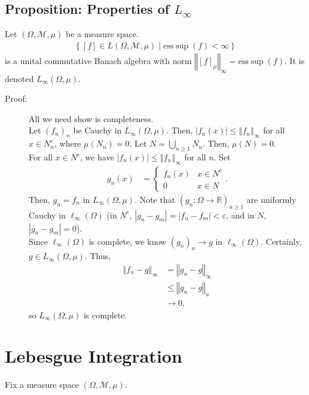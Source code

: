\documentclass[9pt]{extarticle}
\newcommand{\R}{\mathbb{R}}
\newcommand{\norm}[1]{\left\Vert #1 \right\Vert}
\newcommand{\esssup}{\text{ess}\sup}
\begin{document}
  \subsection{Proposition: Properties of $L_{\infty}$}%
  Let $(\Omega,\mathcal{M},\mu)$ be a measure space.
  \begin{align*}
    \left\{[f]\in L(\Omega,\mathcal{M},\mu)\mid \esssup(f) < \infty\right\}
  \end{align*}
  is a unital commutative Banach algebra with norm $\norm{[f]_{\mu}}_{\infty} = \esssup(f)$. It is denoted $L_{\infty}(\Omega,\mu)$.
  \begin{description}
    \item[Proof:] All we need show is completeness.\\

      Let $(f_n)_n$ be Cauchy in $L_{\infty}(\Omega,\mu)$. Then, $|f_n(x)| \leq \norm{f_n}_{\infty}$ for all $x\in N_n^{c}$, where $\mu(N_n) = 0$. Let $N = \bigcup_{n\geq 1} N_n$. Then, $\mu(N) = 0$.\\

      For all $x\in N^{c}$, we have $|f_n(x)| \leq \norm{f_n}_{\infty}$ for all $n$. Set
      \begin{align*}
        g_n(x) &= \begin{cases}
          f_n(x) & x\in N^{c}\\
          0 & x\in N
        \end{cases}.
      \end{align*}
      Then, $g_n = f_n$ in $L_{\infty}(\Omega,\mu)$. Note that $\left(g_n: \Omega \rightarrow \R\right)_{n\geq 1}$ are uniformly Cauchy in $\ell_{\infty}(\Omega)$ (in $N^{c}$, $|g_n - g_m| = |f_n - f_m| < \varepsilon$, and in $N$, $|g_n - g_m| = 0$).\\

      Since $\ell_{\infty}(\Omega)$ is complete, we know $(g_n)_n\rightarrow g$ in $\ell_{\infty}(\Omega)$. Certainly, $g \in L_{\infty}(\Omega,\mu)$. Thus,
      \begin{align*}
        \norm{f_n - g}_{\infty} &= \norm{g_n - g}_{\infty}\\
                                &\leq \norm{g_n - g}_{u}\\
                                &\rightarrow 0,
      \end{align*}
      so $L_{\infty}(\Omega,\mu)$ is complete.
  \end{description}
  \section{Lebesgue Integration}%
  Fix a measure space $(\Omega,\mathcal{M},\mu)$.\\
\end{document}

